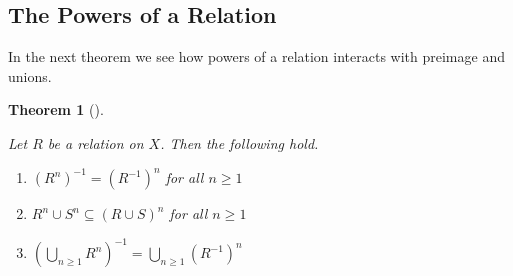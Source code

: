 \documentclass[
  letterpaper,
  10pt,
  reqno,
  twopage,
  openany]{book}
\providecommand{\tightlist}{%
  \setlength{\itemsep}{0pt}\setlength{\parskip}{0pt}}\usepackage{longtable,booktabs,array}
\theoremstyle{plain}
\theoremstyle{definition}
\theoremstyle{definition}
\theoremstyle{definition}
\theoremstyle{plain}
\theoremstyle{plain}
\newtheorem{theorem}{Theorem}[chapter]
\theoremstyle{remark}
\begin{document}
\hypertarget{the-powers-of-a-relation}{%
\subsection{The Powers of a Relation}\label{the-powers-of-a-relation}}

In the next theorem we see how powers of a relation interacts with
preimage and unions.

\leavevmode{}%
\begin{theorem}[]\label{thm-relation-powers-inverse}

Let \(R\) be a relation on \(X\). Then the following hold.

\begin{enumerate}
\def\labelenumi{\arabic{enumi}.}
\tightlist
\item
  \((R^n)^{-1}=(R^{-1})^n\) for all \(n\geq 1\)
\item
  \(R^n \cup S^n\subseteq (R\cup S)^n\) for all \(n\geq 1\)
\item
  \(\left( \bigcup_{n\geq 1} R^n \right)^{-1} = \bigcup_{n\geq 1} (R^{-1})^{n}\)
\end{enumerate}

\end{theorem}
\end{document}

